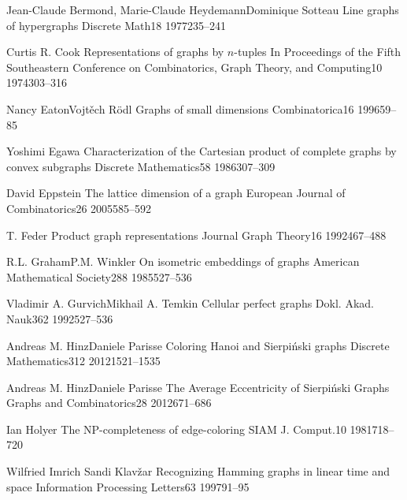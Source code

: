 \documentclass[12pt,a4paper,titlepage,openany]{report}
\begin{document}
 \begin{thebibliography}{99}
\thispagestyle{fancy}

  \articleInJournalManyAuthors
    {Jean-Claude Bermond, Marie-Claude Heydemann}{Dominique Sotteau}
    {Line graphs of hypergraphs}
   {Discrete Math}{18}
   {1977}{235--241} 


  \articleInJournalOneAuthor
    {Curtis R. Cook}
    {Representations of graphs by $n$-tuples}
   {In Proceedings of the Fifth Southeastern Conference on Combinatorics, Graph Theory, and Computing}{10}
   {1974}{303--316}

  \articleInJournalManyAuthors
    {Nancy Eaton}{Vojt\v ech R\" odl}
    {Graphs of small dimensions}
   {Combinatorica}{16}
   {1996}{59--85}

  \articleInJournalOneAuthor
    {Yoshimi Egawa}
    {Characterization of the Cartesian product of complete graphs by convex subgraphs}
   {Discrete Mathematics}{58}
   {1986}{307--309}     

\articleInJournalOneAuthor
    {David Eppstein}
    {The lattice dimension of a graph}
   {European Journal of Combinatorics}{26}
   {2005}{585--592} 

\articleInJournalOneAuthor
    {T. Feder}
    {Product graph representations}
   {Journal Graph Theory}{16}
   {1992}{467--488}

  \articleInJournalManyAuthors
    {R.L. Graham}{P.M. Winkler}
    {On isometric embeddings of graphs}
   {American Mathematical Society}{288}
   {1985}{527--536}

  \articleInJournalManyAuthors
    {Vladimir A. Gurvich}{Mikhail A. Temkin}
    {Cellular perfect graphs}
   {Dokl. Akad. Nauk}{362}
   {1992}{527--536}

  \articleInJournalManyAuthors
    {Andreas M. Hinz}{Daniele Parisse}
    {Coloring Hanoi and Sierpiński graphs}
   {Discrete Mathematics}{312}
   {2012}{1521--1535}  

  \articleInJournalManyAuthors
    {Andreas M. Hinz}{Daniele Parisse}
    {The Average Eccentricity of Sierpi\' nski Graphs}
   {Graphs and Combinatorics}{28}
   {2012}{671--686}

\articleInJournalOneAuthor
    {Ian Holyer}
    {The NP-completeness of edge-coloring}
   {SIAM J. Comput.}{10}
   {1981}{718--720}  

  \articleInJournalManyAuthors
    {Wilfried Imrich} {Sandi Klav\v zar}
    {Recognizing Hamming graphs in linear time and space}
   {Information Processing Letters}{63}
   {1997}{91--95}


\end{thebibliography}
\end{document}
